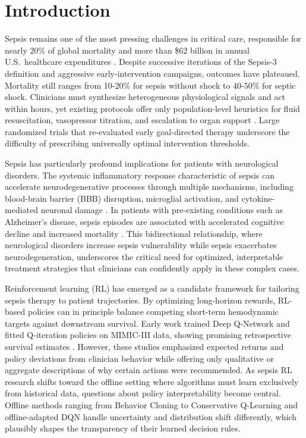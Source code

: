 
\section{Introduction}\label{sec:intro}

Sepsis remains one of the most pressing challenges in critical care, responsible for nearly 20\% of global mortality and more than \$62 billion in annual U.S.\ healthcare expenditures \citep{rudd2020sepsis, fleischmann2016sepsis}. Despite successive iterations of the Sepsis-3 definition \citep{singer2016sepsis3} and aggressive early-intervention campaigns, outcomes have plateaued. Mortality still ranges from 10-20\% for sepsis without shock to 40-50\% for septic shock. Clinicians must synthesize heterogeneous physiological signals and act within hours, yet existing protocols offer only population-level heuristics for fluid resuscitation, vasopressor titration, and escalation to organ support \citep{rhodes2017ssc}. Large randomized trials that re-evaluated early goal-directed therapy \citep{rivers2001egdt, arise2014} underscore the difficulty of prescribing universally optimal intervention thresholds.

Sepsis has particularly profound implications for patients with neurological disorders. The systemic inflammatory response characteristic of sepsis can accelerate neurodegenerative processes through multiple mechanisms, including blood-brain barrier (BBB) disruption, microglial activation, and cytokine-mediated neuronal damage \citep{nwafor2019bbb_targeting, barichello2013oxidative_sepsis}. In patients with pre-existing conditions such as Alzheimer's disease, sepsis episodes are associated with accelerated cognitive decline and increased mortality \citep{guerra2012dementia_risk_icu}. This bidirectional relationship, where neurological disorders increase sepsis vulnerability while sepsis exacerbates neurodegeneration, underscores the critical need for optimized, interpretable treatment strategies that clinicians can confidently apply in these complex cases.

Reinforcement learning (RL) has emerged as a candidate framework for tailoring sepsis therapy to patient trajectories. By optimizing long-horizon rewards, RL-based policies can in principle balance competing short-term hemodynamic targets against downstream survival. Early work trained Deep Q-Network and fitted Q-iteration policies on MIMIC-III data, showing promising retrospective survival estimates \citep{raghu2017sepsis_drl, komorowski2018ai_clinician}. However, these studies emphasized expected returns and policy deviations from clinician behavior while offering only qualitative or aggregate descriptions of why certain actions were recommended. As sepsis RL research shifts toward the offline setting where algorithms must learn exclusively from historical data, questions about policy interpretability become central. Offline methods ranging from Behavior Cloning to Conservative Q-Learning and offline-adapted DQN handle uncertainty and distribution shift differently, which plausibly shapes the transparency of their learned decision rules.

